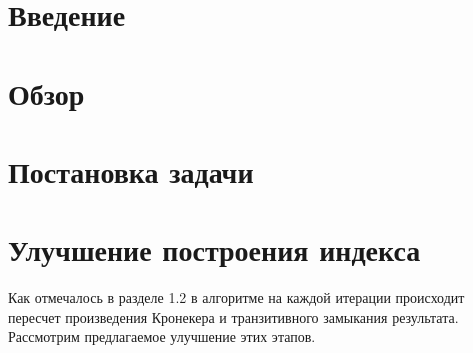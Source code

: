 


\usepackage{ amssymb }
\usepackage[utf8]{inputenc}
\usepackage{babel}
\usepackage{amsthm}
\usepackage{algorithm}
\usepackage{multicol, multirow}

\usepackage{amsmath}
\usepackage{fancyvrb}
\usepackage{tikz}
\usepackage{pgfplots}
\usepackage{fontawesome}

\usetikzlibrary{automata, positioning, shapes,arrows}

\usepackage[caption=false]{subfig}
\usepackage{minted}
\usepackage{sidecap} 
\usepackage{fancyvrb}
\usepackage{wrapfig}
\usepackage{graphicx}
\usepackage{float}
\usepackage{color, colortbl}

\usepackage[noend]{algpseudocode}

\usepackage{hyperref}

\renewcommand{\labelitemii}{$ $}


\theoremstyle{definition}
\newtheorem{definition}{Определение}[section]



\maketitle
\setcounter{tocdepth}{2}
\tableofcontents


\section*{Введение}


\section{Обзор}


\section{Постановка задачи}
\label{sec:task}


\section{Улучшение построения индекса}

Как отмечалось в разделе 1.2 в алгоритме на каждой итерации происходит пересчет произведения Кронекера и транзитивного замыкания результата. Рассмотрим предлагаемое улучшение этих этапов.

